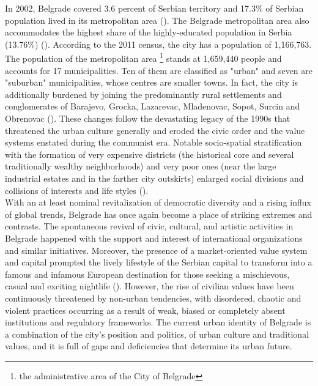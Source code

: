 \documentclass[11pt]{report}
\begin{document}
In 2002, Belgrade covered 3.6 percent of Serbian territory and 17.3\% of Serbian population lived in its metropolitan area (\href{Cities}{\citealt{world_bank_cities_2000}}).
The Belgrade metropolitan area also accommodates the highest share of the highly-educated population in Serbia (13.76\%) (\href{Vukmirovic}{\citealt{vukmirovic_city_2013}}).
According to the 2011 census, the city has a population of 1,166,763.
The population of the metropolitan area
\footnote{the administrative area of the City of Belgrade}                 
stands at 1,659,440 people and accounts for 17 municipalities.
Ten  of them are classified as "urban" and seven are "suburban" municipalities, whose centres are smaller towns.
In fact, the  city  is additionally burdened by joining the predominantly rural  settlements  and  conglomerates  of Barajevo, Grocka,  Lazarevac,  Mladenovac,  Sopot,  Surcin  and Obrenovac (\href{Doytchinov}{\citealt{doytchinov_belgrade_2015}}).
These changes follow  the  devastating legacy of the 1990s that threatened the urban culture generally and eroded the civic order and the value systems enstated during the communist era. Notable socio-spatial stratification with the formation of very expensive districts (the historical core and several traditionally wealthy neighborhoods) and very poor ones (near the large industrial estates and in the farther city outskirts) enlarged social  divisions  and  collisions  of  interests  and  life styles (\href{Hirt}{\citealt{hirt_belgrade_2009}}).
\\

With  an  at  least  nominal  revitalization  of  democratic  diversity  and  a  rising  influx  of global  trends,  Belgrade  has once  again  become  a  place  of  striking  extremes  and  contrasts. The spontaneous  revival  of  civic,  cultural,  and artistic  activities  in  Belgrade  happened  with  the support and interest of international organizations and similar initiatives. Moreover,  the  presence  of  a market-oriented  value  system  and  capital  prompted  the  lively lifestyle of the Serbian capital to transform into a famous and infamous European destination for those seeking a mischievous, casual and exciting nightlife (\href{Doytchinov}{\citealt{doytchinov_urban_2015}}).
However, the rise of civilian values have been continuously  threatened by  non-urban  tendencies,  with disordered,  chaotic and violent practices occurring as a result  of  weak,  biased  or  completely absent institutions and regulatory frameworks. The current urban identity of Belgrade is a combination of the city’s position and politics, of urban culture and traditional values, and it is full of gaps and deficiencies that determine its urban future.
\\
\end{document}
